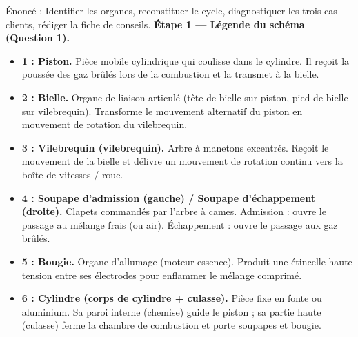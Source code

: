 \documentclass[11pt]{article}
\begin{document}
\begin{exoresolu}
Énoncé : Identifier les organes, reconstituer le cycle, diagnostiquer les trois cas clients, rédiger la fiche de conseils.
\tcblower
\textbf{Étape 1 — Légende du schéma (Question 1).}
\begin{itemize}
\item \textbf{1 : Piston.} Pièce mobile cylindrique qui coulisse dans le cylindre. Il reçoit la poussée des gaz brûlés lors de la combustion et la transmet à la bielle.
\item \textbf{2 : Bielle.} Organe de liaison articulé (tête de bielle sur piston, pied de bielle sur vilebrequin). Transforme le mouvement alternatif du piston en mouvement de rotation du vilebrequin.
\item \textbf{3 : Vilebrequin (vilebrequin).} Arbre à manetons excentrés. Reçoit le mouvement de la bielle et délivre un mouvement de rotation continu vers la boîte de vitesses / roue.
\item \textbf{4 : Soupape d'admission (gauche) / Soupape d'échappement (droite).} Clapets commandés par l'arbre à cames. Admission : ouvre le passage au mélange frais (ou air). Échappement : ouvre le passage aux gaz brûlés.
\item \textbf{5 : Bougie.} Organe d'allumage (moteur essence). Produit une étincelle haute tension entre ses électrodes pour enflammer le mélange comprimé.
\item \textbf{6 : Cylindre (corps de cylindre + culasse).} Pièce fixe en fonte ou aluminium. Sa paroi interne (chemise) guide le piston ; sa partie haute (culasse) ferme la chambre de combustion et porte soupapes et bougie.
\end{itemize}
\end{exoresolu}
\end{document}
